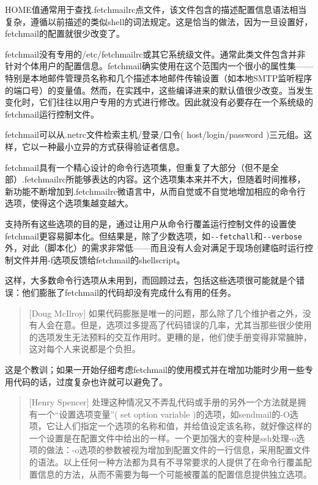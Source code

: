 \documentclass[12pt,oneside]{book}
\begin{document}
\begin{common-format}
HOME值通常用于查找.fetchmailrc点文件，该文件包含的描述配置信息语法相当复杂，遵循以前描述的类似shell的词法规定。这是恰当的做法，因为一旦设置好，fetchmail的配置就很少改变了。

fetchmail没有专用的/etc/fetchmailrc或其它系统级文件。通常此类文件包含并非针对个体用户的配置信息。fetchmail确实使用在这个范围内一个很小的属性集——特别是本地邮件管理员名称和几个描述本地邮件传输设置（如本地SMTP监听程序的端口号）的变量值。然而，在实践中，这些编译进来的默认值很少改变。当发生变化时，它们往往以用户专用的方式进行修改。因此就没有必要存在一个系统级的fetchmail运行控制文件。

fetchmail可以从.netrc文件检索主机/登录/口令( host/login/password )三元组。这样，它以一种最小立异的方式获得验证者信息。

fetchmail具有一个精心设计的命令行选项集，但重复了大部分（但不是全部）.fetchmailrc所能够表达的内容。这个选项集本来并不大，但随着时间推移，新功能不断增加到.fetchmailrc微语言中，从而自觉或不自觉地增加相应的命令行选项，使得这个选项集越变越大。

支持所有这些选项的目的是，通过让用户从命令行覆盖运行控制文件的设置使fetchmail更容易脚本化。但结果是，除了少数选项，如\verb+--fetchall+和\verb+--verbose+外，对此（脚本化）的需求非常低——而且没有人会对满足于现场创建临时运行控制文件并用-f选项反馈给fetchmail的shellscript。

这样，大多数命令行选项从未用到，而回顾过去，包括这些选项很可能就是个错误：他们膨胀了fetchmail的代码却没有完成什么有用的任务。

\begin{quote}[Doug McIlroy]
如果代码膨胀是唯一的问题，那么除了几个维护者之外，没有人会在意。但是，选项过多提高了代码错误的几率，尤其当那些很少使用的选项发生无法预料的交互作用时。更糟的是，他们使手册变得非常臃肿，这对每个人来说都是个负担。
\end{quote}

这是个教训；如果一开始仔细考虑fetchmail的使用模式并在增加功能时少用一些专用代码的话，过度复杂也许就可以避免了。

\begin{quote}[Henry Spencer]
处理这种情况又不弄乱代码或手册的另外一个方法就是拥有一个“设置选项变量”( set option variable )的选项，如sendmail的-O选项，它让人们指定一个选项的名称和值，并给值设定该名称，就好像这样的一个设置是在配置文件中给出的一样。一个更加强大的变种是ssh处理-o选项的做法：-o选项的参数被视为增加到配置文件的一行信息，采用配置文件的语法。以上任何一种方法都为具有不寻常要求的人提供了在命令行覆盖配置信息的方法，从而不需要为每一个可能被覆盖的配置信息提供独立选项。
\end{quote}



\end{common-format}
\end{document}
